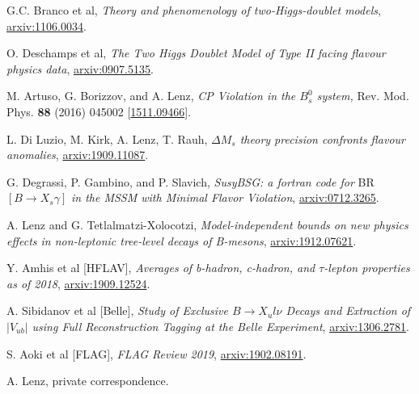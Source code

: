 \documentclass[a4paper,12pt]{article}
\begin{document}
\begin{thebibliography}{99}
G.C. Branco et al, \emph{Theory and phenomenology of two-Higgs-doublet models}, \href{https://arxiv.org/pdf/1106.0034.pdf}{arxiv:1106.0034}.

O. Deschamps et al, \emph{The Two Higgs Doublet Model of Type II facing flavour physics data}, \href{https://arxiv.org/pdf/0907.5135.pdf}{arxiv:0907.5135}.

M. Artuso, G. Borizzov, and A. Lenz, \emph{CP Violation in the $B_s^0$ system,} Rev. Mod. Phys. \textbf{88} (2016) 045002 [\href{https://arxiv.org/abs/1511.09466}{1511.09466}].

L. Di Luzio, M. Kirk, A. Lenz, T. Rauh, \emph{$\Delta M_s$ theory precision confronts flavour anomalies}, \href{https://arxiv.org/pdf/1909.11087.pdf}{arxiv:1909.11087}.

G. Degrassi, P. Gambino, and P. Slavich, \emph{SusyBSG: a fortran code for} BR$[B\to X_s\gamma]$ \emph{in the MSSM with Minimal Flavor Violation}, \href{https://arxiv.org/pdf/0712.3265.pdf}{arxiv:0712.3265}.

A. Lenz and G. Tetlalmatzi-Xolocotzi, \emph{Model-independent bounds on new physics effects in non-leptonic tree-level decays of B-mesons}, \href{https://arxiv.org/pdf/1912.07621.pdf}{arxiv:1912.07621}.

Y. Amhis et al [HFLAV], \emph{Averages of b-hadron, c-hadron, and $\tau$-lepton properties as of 2018}, \href{https://arxiv.org/pdf/1909.12524.pdf}{arxiv:1909.12524}.

A. Sibidanov et al [Belle], \emph{Study of Exclusive $B\to X_ul\nu$ Decays and Extraction of $|V_{ub}|$ using Full Reconstruction Tagging at the Belle Experiment}, \href{https://arxiv.org/pdf/1306.2781.pdf}{arxiv:1306.2781}.

S. Aoki et al [FLAG], \emph{FLAG Review 2019}, \href{https://arxiv.org/pdf/1902.08191.pdf}{arxiv:1902.08191}.

A. Lenz, private correspondence.




\end{thebibliography}
\end{document}
